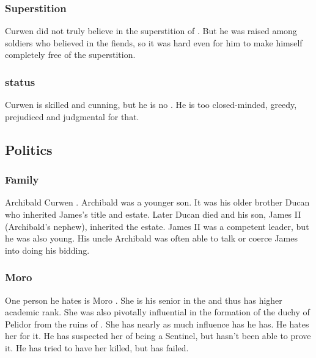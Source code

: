 \subsubsection{Superstition}
Curwen did not truly believe in the superstition of . 
But he was raised among soldiers who believed in the fiends, so it was hard even for him to make himself completely free of the superstition. 





\subsubsection{\Vertex{} status}
Curwen is skilled and cunning, but he is no \vertex.
He is too closed-minded, greedy, prejudiced and judgmental for that.









\subsection{Politics}





\subsubsection{Family}
Archibald Curwen . 
Archibald was a younger son. 
It was his older brother Ducan who inherited James's title and estate. 
Later Ducan died and his son, James II (Archibald's nephew), inherited the estate. 
James II was a competent leader, but he was also young. 
His uncle Archibald was often able to talk or coerce James into doing his bidding. 





\subsubsection{Moro \Cornel}
One person he hates is Moro \Cornel. 
She is his senior in the \ishrah{} and thus has higher academic rank. 
She was also pivotally influential in the formation of the duchy of Pelidor from the ruins of . 
She has nearly as much influence has he has. 
He hates her for it. 
He has suspected her of being a Sentinel, but hasn't been able to prove it. 
He has tried to have her killed, but has failed. 

